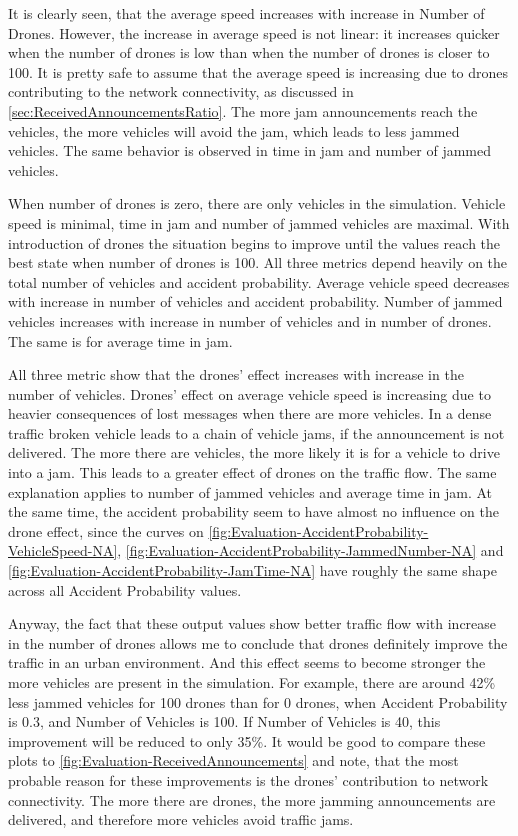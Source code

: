 \documentclass[]{nsm-thesis}
\begin{document}
It is clearly seen, that the average speed increases with increase in Number of Drones. However, the increase in average speed is not linear: it increases quicker when the number of drones is low than when the number of drones is closer to 100. It is pretty safe to assume that the average speed is increasing due to drones contributing to the network connectivity, as discussed in \cref{sec:ReceivedAnnouncementsRatio}. The more jam announcements reach the vehicles, the more vehicles will avoid the jam, which leads to less jammed vehicles. The same behavior is observed in time in jam and number of jammed vehicles.

When number of drones is zero, there are only vehicles in the simulation. Vehicle speed is minimal, time in jam and number of jammed vehicles are maximal. With introduction of drones the situation begins to improve until the values reach the best state when number of drones is 100. All three metrics depend heavily on the total number of vehicles and accident probability. Average vehicle speed decreases with increase in number of vehicles and accident probability. Number of jammed vehicles increases with increase in number of vehicles and in number of drones. The same is for average time in jam.

All three metric show that the drones' effect increases with increase in the number of vehicles. Drones' effect on average vehicle speed is increasing due to heavier consequences of lost messages when there are more vehicles. In a dense traffic broken vehicle leads to a chain of vehicle jams, if the announcement is not delivered. The more there are vehicles, the more likely it is for a vehicle to drive into a jam. This leads to a greater effect of drones on the traffic flow. The same explanation applies to number of jammed vehicles and average time in jam. At the same time, the accident probability seem to have almost no influence on the drone effect, since the curves on \cref{fig:Evaluation-AccidentProbability-VehicleSpeed-NA}, \cref{fig:Evaluation-AccidentProbability-JammedNumber-NA} and \cref{fig:Evaluation-AccidentProbability-JamTime-NA} have roughly the same shape across all Accident Probability values.

Anyway, the fact that these output values show better traffic flow with increase in the number of drones allows me to conclude that drones definitely improve the traffic in an urban environment. And this effect seems to become stronger the more vehicles are present in the simulation. For example, there are around 42\% less jammed vehicles for 100 drones than for 0 drones, when Accident Probability is 0.3, and Number of Vehicles is 100. If Number of Vehicles is 40, this improvement will be reduced to only 35\%. It would be good to compare these plots to \cref{fig:Evaluation-ReceivedAnnouncements} and note, that the most probable reason for these improvements is the drones' contribution to network connectivity. The more there are drones, the more jamming announcements are delivered, and therefore more vehicles avoid traffic jams.
\end{document}
